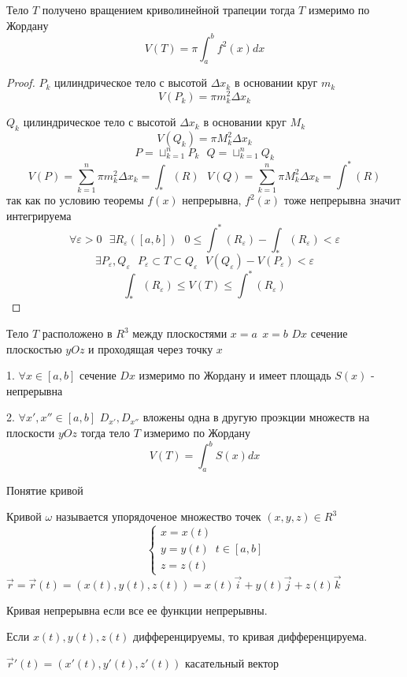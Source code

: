\begin{theorem}
  Тело $T$ получено вращением криволинейной трапеции тогда $T$ измеримо по
  Жордану
  $$
  V(T) = \pi \int_a^b f^2(x) dx
  $$
\end{theorem}

\begin{proof}
  $P_k$ цилиндрическое тело с высотой $\Delta x_k$ в основании круг $m_k$
  $$V(P_k) = \pi m_k^2 \Delta x_k$$

  $Q_k$ цилиндрическое тело с высотой $\Delta x_k$ в основании круг $M_k$
  $$V(Q_k) = \pi M_k^2 \Delta x_k$$
  $$
  P = \sqcup_{k=1}^n P_k ~~~
  Q = \sqcup_{k=1}^n Q_k
  $$
  $$
  V(P) = \sum_{k=1}^n \pi m_k^2 \Delta x_k = \int_* (R) ~~~
  V(Q) = \sum_{k=1}^n \pi M_k^2 \Delta x_k = \int^* (R)
  $$
  так как по условию теоремы $f(x)$ непрерывна, $f^2(x)$ тоже непрерывна значит
  интегрируема
  $$
  \forall \varepsilon > 0 ~~~
  \exists R_{\varepsilon} ([a,b]) ~~~
  0 \le \int^* (R_{\varepsilon}) - \int_* (R_{\varepsilon}) < \varepsilon
  $$
  $$
  \exists P_{\varepsilon}, Q_{\varepsilon} ~~~
  P_{\varepsilon} \subset T \subset Q_{\varepsilon} ~~~
  V(Q_{\varepsilon}) - V(P_{\varepsilon}) < \varepsilon
  $$
  $$
  \int_* (R_{\varepsilon}) \le V(T) \le \int^* (R_{\varepsilon})
  $$
\end{proof}

\begin{theorem}
  Тело $T$ расположено в $R^3$ между плоскостями $x = a ~~ x = b$
  $Dx$ сечение плоскостью $yOz$ и проходящая через точку $x$

  1. $\forall x \in [a,b]$ сечение $Dx$ измеримо по Жордану и имеет площадь
  $S(x)$ - непрерывна

  2. $\forall x', x'' \in [a,b]$ $D_{x'}, D_{x''}$ вложены одна в другую
  проэкции множеств на плоскости $yOz$ тогда тело $T$ измеримо по Жордану
  $$
  V(T) = \int_a^b S(x)dx
  $$
\end{theorem}

\begin{title}[\Large]
  Понятие кривой
\end{title}

\begin{defin}[кривой]
  Кривой $\omega$ называется упорядоченое множество точек $(x,y,z) \in R^3$
  $$
    \left\{
      \begin{array}{l}
        x = x(t) \\
        y = y(t) \\
        z = z(t)
      \end{array}
    \right.
    t \in [a,b]
  $$
  $
  \vec r = \vec r (t) = ( x(t), y(t) , z(t) ) =
  x(t)\vec i + y(t)\vec j + z(t)\vec k
  $

  Кривая непрерывна если все ее функции непрерывны.

  Если $x(t), y(t), z(t)$ дифференцируемы, то кривая дифференцируема.

  $\vec r'(t) = ( x'(t), y'(t) , z'(t) )$ касательный вектор
\end{defin}

